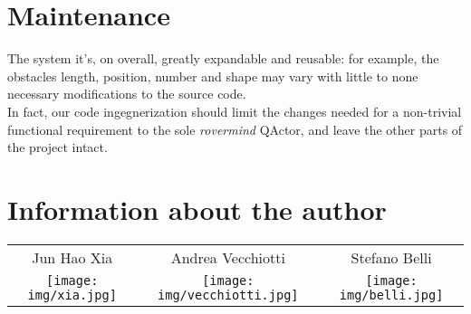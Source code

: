\documentclass{llncs}
\newcommand{\labelsec}[1]{\label{sec:#1}}
\newcommand{\xauthA}{Jun Hao Xia}
\newcommand{\xauthB}{Andrea Vecchiotti}
\newcommand{\xauthC}{Stefano Belli}
\begin{document}

\section{Maintenance}
\labelsec{Maintenance}
The system it's, on overall, greatly expandable and reusable: for example, the obstacles length, position, number and shape may vary with little to none necessary modifications to the source code.\\
In fact, our code ingegnerization should limit the changes needed for a non-trivial functional requirement to the sole \textit{rovermind} QActor, and leave the other parts of the project intact.



\newpage
\section{Information about the author}
\labelsec{Author}
\begin{table}[]
\centering
\begin{tabular}{ccc}
 \xauthA & \xauthB & \xauthC \\
\hspace{-1.5cm}
 \texttt{[image: img/xia.jpg]}& \texttt{[image: img/vecchiotti.jpg]} &\texttt{[image: img/belli.jpg]} 
\end{tabular}
\end{table}



\end{document}
